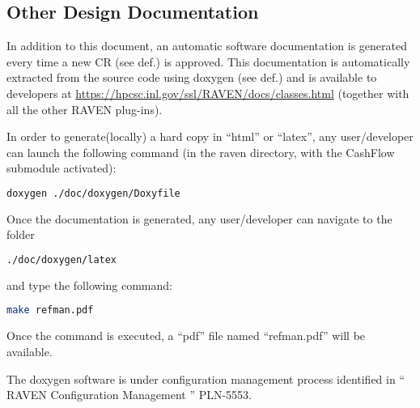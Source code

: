 \subsection{Other Design Documentation}

In addition to this document, an automatic software documentation
is generated every time a new CR (see def.) is approved. This
documentation is automatically extracted from the source code using
doxygen (see def.) and is available to developers at
\url{https://hpcsc.inl.gov/ssl/RAVEN/docs/classes.html} (together with all the other RAVEN plug-ins).

In order to generate(locally) a hard copy in ``html'' or ``latex'', any user/developer can 
launch the 
following command (in the raven directory, with the CashFlow submodule activated):
\begin{lstlisting}[language=bash]
doxygen ./doc/doxygen/Doxyfile
\end{lstlisting}
Once the documentation is generated, any user/developer can navigate to the folder
\begin{lstlisting}[language=bash]
./doc/doxygen/latex
\end{lstlisting}
and type the following command:
\begin{lstlisting}[language=bash]
make refman.pdf
\end{lstlisting}
Once the command is executed, a ``pdf'' file named ``refman.pdf'' will be available.

The doxygen software is under configuration management process identified in
`` RAVEN Configuration Management '' PLN-5553.
